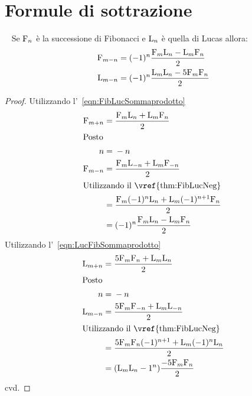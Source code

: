 \section{Formule di sottrazione}
\begin{thm}~\cite{Rabinowitz_1996}\label{thm:FibLucFormSottazione}
	Se $\mathrm{F}_{n}$ è la successione di Fibonacci e  $\mathrm{L}_{n}$ è quella di Lucas
	allora:
	\begin{align}
		\mathrm{F}_{m-n}={} & (-1)^n\dfrac{\mathrm{F}_{m}\mathrm{L}_{n}-\mathrm{L}_{m}\mathrm{F}_{n}}{2}  \\
		\mathrm{L}_{m-n}={} & (-1)^n\dfrac{\mathrm{L}_{m}\mathrm{L}_{n}-5\mathrm{F}_{m}\mathrm{F}_{n}}{2}
	\end{align}
\end{thm}
\begin{proof}
	Utilizzando l'~\vref{eqn:FibLucSommaprodotto}
	\begin{align*}
		\Fib{m+n}={} & \dfrac{\Fib{m}\Luc{n}+\Luc{m}\Fib{n}}{2}                 \\
		\intertext{Posto}
		n={}         & -n                                                       \\
		\Fib{m-n}={} & \dfrac{\Fib{m}\Luc{-n}+\Luc{m}\Fib{-n}}{2}               \\
		\intertext{Utilizzando il~\vref{thm:FibLucNeg} }
		={}          & \dfrac{\Fib{m}(-1)^n\Luc{n}+\Luc{m}(-1)^{n+1}\Fib{n}}{2} \\
		={}          & (-1)^n\dfrac{\Fib{m}\Luc{n}-\Luc{m}\Fib{n}}{2}
	\end{align*}
	Utilizzando l'~\vref{eqn:LucFibSommaprodotto}
	\begin{align*}
		\Luc{m+n}={} & \dfrac{5\Fib{m}\Fib{n}+\Luc{m}\Luc{n}}{2}                 \\
		\intertext{Posto}
		n={}         & -n                                                        \\
		\Luc{m-n}={} & \dfrac{5\Fib{m}\Fib{-n}+\Luc{m}\Luc{-n}}{2}               \\
		\intertext{Utilizzando il~\vref{thm:FibLucNeg} }
		={}          & \dfrac{5\Fib{m}\Fib{n}(-1)^{n+1}+\Luc{m}(-1)^n\Luc{n}}{2} \\
		={}          & (\Luc{m}\Luc{n}-1^n)\dfrac{-5\Fib{m}\Fib{n}}{2}           \\
	\end{align*}
	cvd.
\end{proof}
